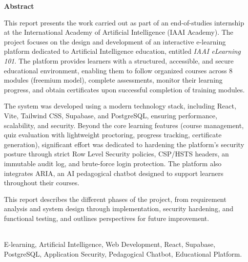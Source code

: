 \documentclass[12pt, a4paper]{report}
\begin{document}
\clearpage
\begin{center}
  {\sffamily\large\bfseries Abstract}
\end{center}
\vspace{0.5cm}
\onehalfspacing
{\selectfont\fontsize{12}{18}\selectfont
This report presents the work carried out as part of an end-of-studies internship at the International Academy of Artificial Intelligence (IAAI Academy). The project focuses on the design and development of an interactive e-learning platform dedicated to Artificial Intelligence education, entitled \textit{IAAI eLearning 101}. The platform provides learners with a structured, accessible, and secure educational environment, enabling them to follow organized courses across 8 modules (freemium model), complete assessments, monitor their learning progress, and obtain certificates upon successful completion of training modules.

The system was developed using a modern technology stack, including React, Vite, Tailwind CSS, Supabase, and PostgreSQL, ensuring performance, scalability, and security. Beyond the core learning features (course management, quiz evaluation with lightweight proctoring, progress tracking, certificate generation), significant effort was dedicated to hardening the platform's security posture through strict Row Level Security policies, CSP/HSTS headers, an immutable audit log, and brute-force login protection. The platform also integrates ARIA, an AI pedagogical chatbot designed to support learners throughout their courses.

This report describes the different phases of the project, from requirement analysis and system design through implementation, security hardening, and functional testing, and outlines perspectives for future improvement.
}

\\[0.2cm]
{\selectfont\fontsize{12}{16}\selectfont
E-learning, Artificial Intelligence, Web Development, React, Supabase, PostgreSQL,
Application Security, Pedagogical Chatbot, Educational Platform.
}

\clearpage
{}
\listoffigures
\clearpage
{}
\listoftables
\clearpage
{}
\tableofcontents

\clearpage
\renewcommand{\chaptername}{}
\renewcommand{\thechapter}{\Roman{chapter}}
\end{document}
